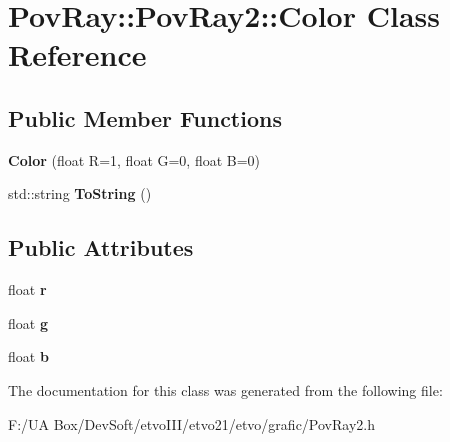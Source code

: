 \section{Pov\+Ray\+:\+:Pov\+Ray2\+:\+:Color Class Reference}
\label{class_pov_ray_1_1_pov_ray2_1_1_color}
\subsection*{Public Member Functions}
\begin{DoxyCompactItemize}
\item 
\mbox{\label{class_pov_ray_1_1_pov_ray2_1_1_color_a14d3b4d82e65897414173376488eb0ae}} 
{\bfseries Color} (float R=1, float G=0, float B=0)
\item 
\mbox{\label{class_pov_ray_1_1_pov_ray2_1_1_color_a86d339a9eb53cb2fd63d0e051675b0a1}} 
std\+::string {\bfseries To\+String} ()
\end{DoxyCompactItemize}
\subsection*{Public Attributes}
\begin{DoxyCompactItemize}
\item 
\mbox{\label{class_pov_ray_1_1_pov_ray2_1_1_color_a3f25183ed6fe781b5c49222ff7438a60}} 
float {\bfseries r}
\item 
\mbox{\label{class_pov_ray_1_1_pov_ray2_1_1_color_aacee6993ef722705b5ea5837c12924aa}} 
float {\bfseries g}
\item 
\mbox{\label{class_pov_ray_1_1_pov_ray2_1_1_color_a0c8d9f83d0914f63ab1b178aa0cd66ae}} 
float {\bfseries b}
\end{DoxyCompactItemize}


The documentation for this class was generated from the following file\+:\begin{DoxyCompactItemize}
\item 
F\+:/\+U\+A Box/\+Dev\+Soft/etvo\+I\+I\+I/etvo21/etvo/grafic/Pov\+Ray2.\+h\end{DoxyCompactItemize}
